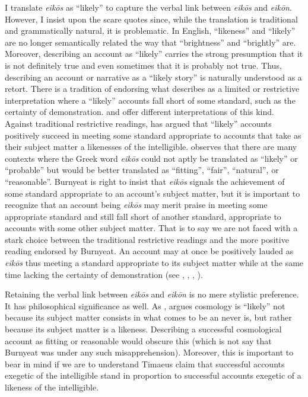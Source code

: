 I translate \emph{eikōs} as ``likely'' to capture the verbal link between \emph{eikōs} and \emph{eikōn}. However, I insist upon the scare quotes since, while the translation is traditional and grammatically natural, it is problematic. In English, ``likeness'' and ``likely'' are no longer semantically related the way that ``brightness'' and ``brightly'' are. Moreover, describing an account as ``likely'' carries the strong presumption that it is not definitely true and even sometimes that it is probably not true. Thus, describing an account or narrative as a ``likely story'' is naturally understood as a retort. There is a tradition of endorsing what \citet[214]{Betegh:2010aa} describes as a limited or restrictive interpretation where a ``likely'' accounts fall short of some standard, such as the certainty of demonstration. \citet[59--60, 73--4, 440--1]{Taylor:1928qb} and \citet[28--30]{Cornford:1935fk} offer different interpretations of this kind. Against traditional restrictive readings, \citet{Burnyeat:2005it} has argued that ``likely'' accounts positively succeed in meeting some standard appropriate to accounts that take as their subject matter a likenesses of the intelligible. \citet[146--7]{Burnyeat:2005it} observes that there are many contexts where the Greek word \emph{eikōs} could not aptly be translated as ``likely'' or ``probable'' but would be better translated as ``fitting'', ``fair'', ``natural'', or ``reasonable''. Burnyeat is right to insist that \emph{eikōs} signals the achievement of some standard appropriate to an account's subject matter, but it is important to recognize that an account being \emph{eikōs} may merit praise in meeting some appropriate standard and still fall short of another standard, appropriate to accounts with some other subject matter. That is to say we are not faced with a stark choice between the traditional restrictive readings and the more positive reading endorsed by Burnyeat. An account may at once be positively lauded as \emph{eikōs} thus meeting a standard appropriate to its subject matter while at the same time lacking the certainty of demonstration (see \citealt{Betegh:2010aa}, \citealt{Mourelatos:2010bz}, \citealt[chapter 3]{Bryan:2012bt}, \citealt[33-4 n15]{Broadie:2012vl}).

Retaining the verbal link between \emph{eikōs} and \emph{eikōn} is no mere stylistic preference. It has philosophical significance as well. As \citealt[chapter 3]{Bryan:2012bt}, argues cosmology is ``likely'' not because its subject matter consists in what comes to be an never is, but rather because its subject matter is a likeness. Describing a successful cosmological account as fitting or reasonable would obscure this (which is not say that Burnyeat was under any such misapprehension). Moreover, this is important to bear in mind if we are to understand Timaeus claim that successful accounts exegetic of the intelligible stand in proportion to successful accounts exegetic of a likeness of the intelligible.

